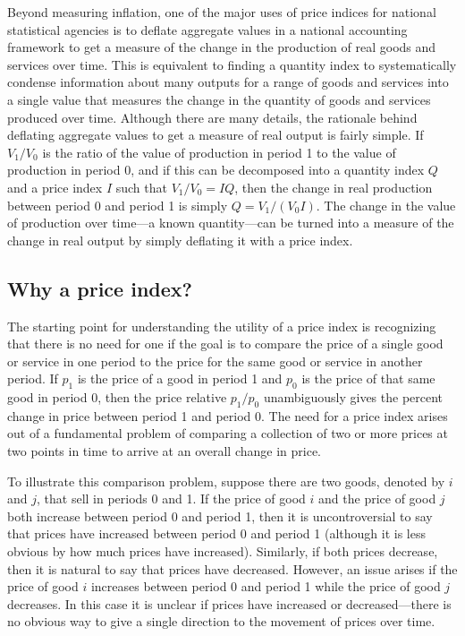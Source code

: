\documentclass[]{article}
\begin{document}
Beyond measuring inflation, one of the major uses of price indices for national statistical agencies is to deflate aggregate values in a national accounting framework to get a measure of the change in the production of real goods and services over time. This is equivalent to finding a quantity index to systematically condense information about many outputs for a range of goods and services into a single value that measures the change in the quantity of goods and services produced over time. Although there are many details, the rationale behind deflating aggregate values to get a measure of real output is fairly simple. If \(V_1/V_0\) is the ratio of the value of production in period 1 to the value of production in period 0, and if this can be decomposed into a quantity index \(Q\) and a price index \(I\) such that \(V_1/V_0 = IQ\), then the change in real production between period 0 and period 1 is simply \(Q = V_1 / (V_0 I)\). The change in the value of production over time---a known quantity---can be turned into a measure of the change in real output by simply deflating it with a price index.

\hypertarget{why-a-price-index}{%
\subsection{Why a price index?}\label{why-a-price-index}}

The starting point for understanding the utility of a price index is recognizing that there is no need for one if the goal is to compare the price of a single good or service in one period to the price for the same good or service in another period. If \(p_1\) is the price of a good in period 1 and \(p_0\) is the price of that same good in period 0, then the price relative \(p_1/p_0\) unambiguously gives the percent change in price between period 1 and period 0. The need for a price index arises out of a fundamental problem of comparing a collection of two or more prices at two points in time to arrive at an overall change in price.

To illustrate this comparison problem, suppose there are two goods, denoted by \(i\) and \(j\), that sell in periods 0 and 1. If the price of good \(i\) and the price of good \(j\) both increase between period 0 and period 1, then it is uncontroversial to say that prices have increased between period 0 and period 1 (although it is less obvious by how much prices have increased). Similarly, if both prices decrease, then it is natural to say that prices have decreased. However, an issue arises if the price of good \(i\) increases between period 0 and
period 1 while the price of good \(j\) decreases. In this case it is unclear if prices have increased or decreased---there is no obvious way to give a single direction to the movement of prices over time.
\end{document}

